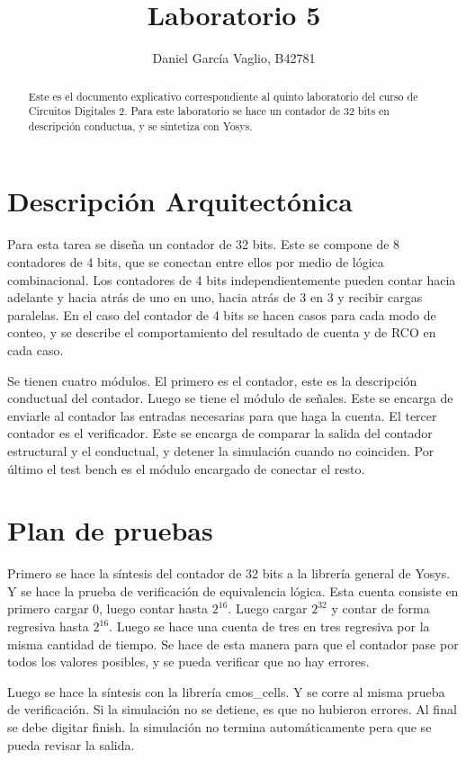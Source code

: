 \documentclass {article}
\begin{document}
\title{Laboratorio 5}
\author{Daniel García Vaglio, B42781}
\maketitle
\begin{abstract}
Este es el documento explicativo correspondiente al quinto laboratorio
del curso de Circuitos Digitales 2.  Para este laboratorio se hace un
contador de 32 bits en descripción conductua, y se sintetiza con Yosys.
\end{abstract}


\section{Descripción Arquitectónica}

Para esta tarea se diseña un contador de 32 bits. Este se compone de 8
contadores de 4 bits, que se conectan entre ellos por medio de lógica
combinacional. Los contadores de 4 bits independientemente pueden
contar hacia adelante y hacia atrás de uno en uno, hacia atrás de 3 en
3 y recibir cargas paralelas.  En el caso del contador de 4 bits se
hacen casos para cada modo de conteo, y se describe el comportamiento
del resultado de cuenta y de RCO en cada caso.

Se tienen cuatro módulos. El primero es el contador, este es la
descripción conductual del contador. Luego se tiene el módulo de
señales.  Este se encarga de enviarle al contador las entradas
necesarias para que haga la cuenta. El tercer contador es el
verificador. Este se encarga de comparar la salida del contador
estructural y el conductual, y detener la simulación cuando no
coinciden. Por último el test bench es el módulo encargado de conectar
el resto.

\section{Plan de pruebas}

Primero se hace la síntesis del contador de 32 bits a la librería
general de Yosys. Y se hace la prueba de verificación de equivalencia
lógica. Esta cuenta consiste en primero cargar 0, luego contar hasta
$2^{16}$. Luego cargar $2^{32}$ y contar de forma regresiva hasta
$2^{16}$.  Luego se hace una cuenta de tres en tres regresiva por la
misma cantidad de tiempo. Se hace de esta manera para que el contador
pase por todos los valores posibles, y se pueda verificar que no hay
errores.

Luego se hace la síntesis con la librería cmos\_cells. Y se corre al
misma prueba de verificación. Si la simulación no se detiene, es que
no hubieron errores. Al final se debe digitar finish. la simulación no
termina automáticamente pera que se pueda revisar la salida.
\end{document}
